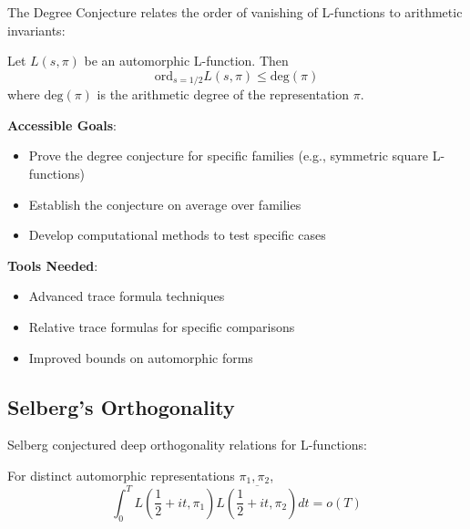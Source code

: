 The Degree Conjecture relates the order of vanishing of L-functions to arithmetic invariants:

\begin{conjecture}
Let $L(s, \pi)$ be an automorphic L-function. Then
\begin{equation}
\text{ord}_{s=1/2} L(s, \pi) \leq \text{deg}(\pi)
\end{equation}
where $\text{deg}(\pi)$ is the arithmetic degree of the representation $\pi$.
\end{conjecture}

\begin{research_problem}
\textbf{Accessible Goals}:
\begin{itemize}
\item Prove the degree conjecture for specific families (e.g., symmetric square L-functions)
\item Establish the conjecture on average over families
\item Develop computational methods to test specific cases
\end{itemize}

\textbf{Tools Needed}:
\begin{itemize}
\item Advanced trace formula techniques
\item Relative trace formulas for specific comparisons
\item Improved bounds on automorphic forms
\end{itemize}
\end{research_problem}

\subsection{Selberg's Orthogonality}
\label{subsec:selberg_orthogonality}

Selberg conjectured deep orthogonality relations for L-functions:

\begin{conjecture}
For distinct automorphic representations $\pi_1, \pi_2$,
\begin{equation}
\int_0^T L\left(\frac{1}{2} + it, \pi_1\right) \overline{L\left(\frac{1}{2} + it, \pi_2\right)} dt = o(T)
\end{equation}
\end{conjecture}

